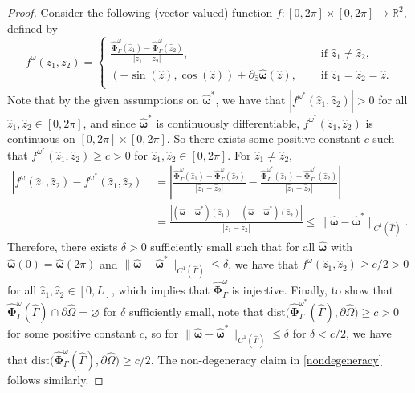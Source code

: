 \documentclass[11pt]{article}
\newcommand{\bd}{\boldsymbol}
\def\R{{\mathbb R}}
\theoremstyle{definition}
\begin{document}
\begin{proof}
Consider the following (vector-valued) function $f: [0, 2\pi] \times [0, 2\pi] \to \R^{2}$, defined by
\begin{equation*}
f^{\omega}(z_{1}, z_{2}) = \begin{cases}
\displaystyle \frac{\hat{\bd{\Phi}}^{\omega}_{\Gamma}(\hat{z}_{1}) - \hat{\bd{\Phi}}^{\omega}_{\Gamma}(\hat{z}_{2})}{|z_{1} - z_{2}|}, \quad &\text{ if } \hat{z}_{1} \ne \hat{z}_{2}, \\
(-\sin(\hat{z}), \cos(\hat{z})) + \partial_{\hat{z}} \hat{\bd{\omega}}(\hat{z}), \quad &\text{ if } \hat{z}_{1} = \hat{z}_{2} = \hat{z}. \\
\end{cases}
\end{equation*}
Note that by the given assumptions on $\hat{\bd{\omega}}^{*}$, we have that $|f^{\omega^{*}}(\hat{z}_{1}, \hat{z}_{2})| > 0$ for all $\hat{z}_{1}, \hat{z}_{2} \in [0, 2\pi]$, and since $\hat{\bd{\omega}}^{*}$ is continuously differentiable, $f^{\omega^{*}}(\hat{z}_{1}, \hat{z}_{2})$ is continuous on $[0, 2\pi] \times [0, 2\pi]$. So there exists some positive constant $c$ such that $f^{\omega^{*}}(\hat{z}_{1}, \hat{z}_{2}) \ge c > 0$ for $\hat{z}_{1}, \hat{z}_{2} \in [0, 2\pi]$. For $\hat{z}_{1} \ne \hat{z}_{2}$, 
\begin{align*}
|f^{\omega}(\hat{z}_{1}, \hat{z}_{2}) - f^{\omega^{*}}(\hat{z}_{1}, \hat{z}_{2})| &= \left|\frac{\hat{\bd{\Phi}}^{\omega}_{\Gamma}(\hat{z}_{1}) - \hat{\bd{\Phi}}^{\omega}_{\Gamma}(\hat{z}_{2})}{|\hat{z}_{1} - \hat{z}_{2}|} - \frac{\hat{\bd{\Phi}}^{\omega^{*}}_{\Gamma}(\hat{z}_{1}) - \hat{\bd{\Phi}}^{\omega^{*}}_{\Gamma}(\hat{z}_{2})}{|\hat{z}_{1} - \hat{z}_{2}|}\right| \\
&= \frac{|(\hat{\bd{\omega}} - \hat{\bd{\omega}}^{*})(\hat{z}_{1}) - (\hat{\bd{\omega}} - \hat{\bd{\omega}}^{*})(\hat{z}_{2})|}{|\hat{z}_{1} - \hat{z}_{2}|} \le \|\hat{\bd{\omega}} - \hat{\bd{\omega}}^{*}\|_{C^{1}(\hat{\Gamma})}.
\end{align*}
Therefore, there exists $\delta > 0$ sufficiently small such that for all $\hat{\bd{\omega}}$ with $\hat{\bd{\omega}}(0) = \hat{\bd{\omega}}(2\pi)$ and $\|\hat{\bd{\omega}} - \hat{\bd{\omega}}^{*}\|_{C^{1}(\hat{\Gamma})} \le \delta$, we have that $f^{\omega}(\hat{z}_{1}, \hat{z}_{2}) \ge c/2 > 0$ for all $\hat{z}_{1}, \hat{z}_{2} \in [0, L]$, which implies that $\hat{\bd{\Phi}}^{\omega}_{\Gamma}$ is injective. Finally, to show that $\hat{\bd{\Phi}}^{\omega}_{\Gamma}(\hat{\Gamma}) \cap \partial \hat{\Omega} = \varnothing$ for $\delta$ sufficiently small, note that $\text{dist}\Big(\hat{\bd{\Phi}}^{\omega^{*}}_{\Gamma}(\hat{\Gamma}), \partial \hat{\Omega}\Big) \ge c > 0$ for some positive constant $c$, so for $\|\hat{\bd{\omega}} - \hat{\bd{\omega}}^{*}\|_{C^{1}(\hat{\Gamma})} \le \delta$ for $\delta < c/2$, we have that $\text{dist}\Big(\hat{\bd{\Phi}}^{\omega}_{\Gamma}(\hat{\Gamma}), \partial \hat{\Omega}\Big) \ge c/2$. The non-degeneracy claim in \eqref{nondegeneracy} follows similarly.

\end{proof}
\end{document}

